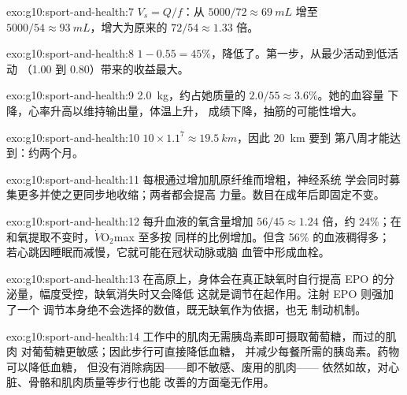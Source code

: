 \begin{solution}{exo:g10:sport-and-health:7}
$V_s = Q/f$：从 $5000/72 \approx \qty{69}{mL}$ 增至 $5000/54 \approx
\qty{93}{mL}$，增大为原来的 $72/54 \approx 1.33$ 倍。
\end{solution}

\begin{solution}{exo:g10:sport-and-health:8}
$1 - 0.55 = 45\%$，降低了。第一步，从最少活动到低活动
（1.00 到 0.80）带来的收益最大。
\end{solution}

\begin{solution}{exo:g10:sport-and-health:9}
\qty{2.0}{kg}，约占她质量的 $2.0/55 \approx 3.6\%$。她的血容量
下降，心率升高以维持输出量，体温上升，
成绩下降，抽筋的可能性增大。
\end{solution}

\begin{solution}{exo:g10:sport-and-health:10}
$10 \times 1.1^7 \approx \qty{19.5}{km}$，因此 \qty{20}{km} 要到
第八周才能达到：约两个月。
\end{solution}

\begin{solution}{exo:g10:sport-and-health:11}
每根通过增加肌原纤维而增粗，神经系统
学会同时募集更多并使之更同步地收缩；两者都会提高
力量。数目在成年后即固定不变。
\end{solution}

\begin{solution}{exo:g10:sport-and-health:12}
每升血液的氧含量增加 $56/45 \approx 1.24$ 倍，约 24\%；在
和氧提取不变时，$\dot V\!\mathrm{O_2}$max 至多按
同样的比例增加。但含 56\% 的血液稠得多；
若心跳因睡眠而减慢，它就可能在冠状动脉或脑
血管中形成血栓。
\end{solution}

\begin{solution}{exo:g10:sport-and-health:13}
在高原上，身体会在真正缺氧时自行提高
EPO 的分泌量，幅度受控，缺氧消失时又会降低
这就是调节在起作用。注射 EPO 则强加了一个
调节本身绝不会选择的数值，既无缺氧作为依据，也无
制动机制。
\end{solution}

\begin{solution}{exo:g10:sport-and-health:14}
工作中的肌肉无需胰岛素即可摄取葡萄糖，而过的肌肉
对葡萄糖更敏感；因此步行可直接降低血糖，
并减少每餐所需的胰岛素。药物可以降低血糖，
但没有消除病因——即不敏感、废用的肌肉——
依然如故，对心脏、骨骼和肌肉质量等步行也能
改善的方面毫无作用。
\end{solution}

